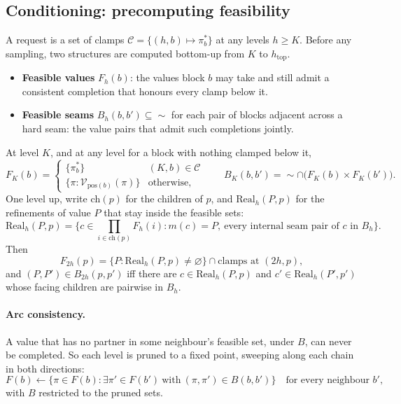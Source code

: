 \documentclass[11pt]{article}
\newcommand{\1}{\mathds{1}}
\begin{document}
\subsection{Conditioning: precomputing feasibility}

A request is a set of clamps $\mathcal C = \{(h, b) \mapsto \pi^*_b\}$ at any levels $h \ge K$.
Before any sampling, two structures are computed bottom-up from $K$ to $h_{\text{top}}$.
\begin{itemize}
  \item \textbf{Feasible values} $F_h(b)$: the values block $b$ may take and still admit a
        consistent completion that honours every clamp below it.
  \item \textbf{Feasible seams} $B_h(b, b') \subseteq {\sim}$ for each pair of blocks adjacent
        across a hard seam: the value pairs that admit such completions jointly.
\end{itemize}
At level $K$, and at any level for a block with nothing clamped below it,
\[
  F_K(b) = \begin{cases} \{\pi^*_b\} & (K, b) \in \mathcal C \\
                         \{\pi : \mathcal V_{\mathrm{pos}(b)}(\pi)\} & \text{otherwise,} \end{cases}
  \qquad
  B_K(b, b') = {\sim} \cap \big(F_K(b) \times F_K(b')\big).
\]
One level up, write $\mathrm{ch}(p)$ for the children of $p$, and
$\mathrm{Real}_h(P, p)$ for the refinements of value $P$ that stay inside the feasible sets:
\[
  \mathrm{Real}_h(P, p) = \big\{c \in \textstyle\prod_{i \in \mathrm{ch}(p)} F_h(i) :
    m(c) = P,\ \text{every internal seam pair of } c \text{ in } B_h \big\}.
\]
Then
\[
  F_{2h}(p) = \big\{P : \mathrm{Real}_h(P, p) \neq \varnothing\big\} \cap \text{clamps at } (2h, p),
\]
and $(P, P') \in B_{2h}(p, p')$ iff there are $c \in \mathrm{Real}_h(P, p)$ and
$c' \in \mathrm{Real}_h(P', p')$ whose facing children are pairwise in $B_h$.

\paragraph{Arc consistency.} A value that has no partner in some neighbour's feasible set, under
$B$, can never be completed. So each level is pruned to a fixed point, sweeping along each chain
in both directions:
\[
  F(b) \leftarrow \{\pi \in F(b) : \exists \pi' \in F(b')\ \text{with}\ (\pi, \pi') \in B(b, b')\}
  \quad \text{for every neighbour } b',
\]
with $B$ restricted to the pruned sets.
\end{document}
